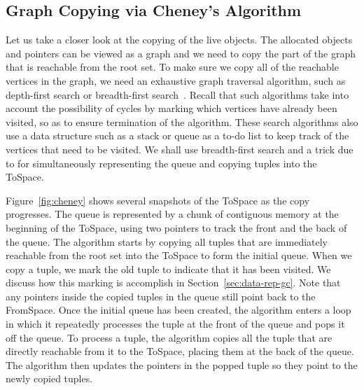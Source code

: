 \documentclass[11pt]{book}
\begin{document}
\subsection{Graph Copying via Cheney's Algorithm}
\label{sec:cheney}
Let us take a closer look at the copying of the live objects. The
allocated objects and pointers can be viewed as a graph and we need to
copy the part of the graph that is reachable from the root set. To
make sure we copy all of the reachable vertices in the graph, we need
an exhaustive graph traversal algorithm, such as depth-first search or
breadth-first search~\citep{Moore:1959aa,Cormen:2001uq}. Recall that
such algorithms take into account the possibility of cycles by marking
which vertices have already been visited, so as to ensure termination
of the algorithm. These search algorithms also use a data structure
such as a stack or queue as a to-do list to keep track of the vertices
that need to be visited. We shall use breadth-first search and a trick
due to \citet{Cheney:1970aa} for simultaneously representing the queue
and copying tuples into the ToSpace.

Figure~\ref{fig:cheney} shows several snapshots of the ToSpace as the
copy progresses. The queue is represented by a chunk of contiguous
memory at the beginning of the ToSpace, using two pointers to track
the front and the back of the queue. The algorithm starts by copying
all tuples that are immediately reachable from the root set into the
ToSpace to form the initial queue.  When we copy a tuple, we mark the
old tuple to indicate that it has been visited. We discuss how this
marking is accomplish in Section~\ref{sec:data-rep-gc}. Note that any
pointers inside the copied tuples in the queue still point back to the
FromSpace. Once the initial queue has been created, the algorithm
enters a loop in which it repeatedly processes the tuple at the front
of the queue and pops it off the queue.  To process a tuple, the
algorithm copies all the tuple that are directly reachable from it to
the ToSpace, placing them at the back of the queue. The algorithm then
updates the pointers in the popped tuple so they point to the newly
copied tuples.
\end{document}
